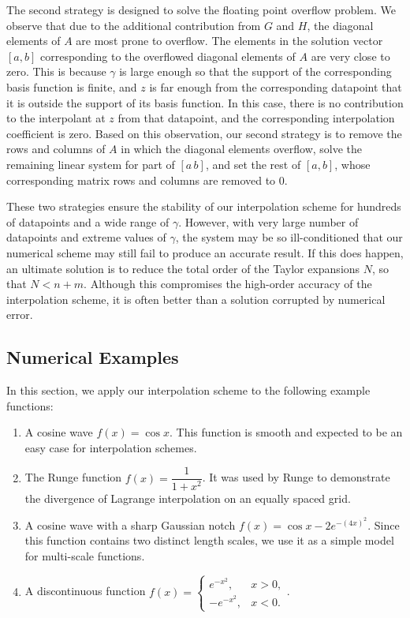 The second strategy is designed to solve the floating point overflow problem.  
We observe that due to the additional contribution from $G$ and $H$,
the diagonal elements of $A$ are most prone to overflow.
The elements in the solution vector $[a,b]$ corresponding to
the overflowed diagonal elements of $A$ are very close to zero.
This is because $\gamma$ is large enough so that
the support of the corresponding basis function is finite, and $z$ is far
enough from the corresponding datapoint that it is outside the support of
its basis function.  In this case, there is no contribution to the interpolant
at $z$ from that datapoint, and the corresponding interpolation coefficient
is zero.  Based on
this observation, our second strategy is to remove the rows and columns of $A$
in which the diagonal elements overflow, solve the remaining linear system for
part of $[a\,b]$, and set the rest of $[a,b]$, whose corresponding matrix rows
and columns are removed to 0.

These two strategies ensure the stability
of our interpolation scheme for hundreds of datapoints and
a wide range of $\gamma$.  However, with very large number of datapoints
and extreme values of $\gamma$, the system may be so ill-conditioned that
our numerical scheme may still fail to produce an
accurate result.  If this does happen, an ultimate solution is to reduce the
total order of the Taylor expansions $N$, so that $N < n+m$.  Although this
compromises the high-order accuracy of the interpolation scheme, it is often
better than a solution corrupted by numerical error.



\subsection{Numerical Examples}

In this section, we apply our interpolation scheme to the following example
functions:
\begin{enumerate}
\item A cosine wave $ f(x) = \cos x $.  This function is smooth and expected
      to be an easy case for interpolation schemes.
\item The Runge function $ f(x) = \dfrac{1}{1+x^2} $.  It was used by Runge
      \cite[]{runge} to demonstrate the divergence of Lagrange interpolation on
      an equally spaced grid.
\item A cosine wave with a sharp Gaussian notch
      $ f(x) = \cos x - 2 e^{-(4x)^2} $.
      Since this function contains two distinct length scales, we use it
      as a simple model for multi-scale functions.
\item A discontinuous function
      $ f(x) = \begin{cases} e^{-x^2}, & x > 0 , \\
                            -e^{-x^2}, & x < 0 . \end{cases} $.
\end{enumerate}

